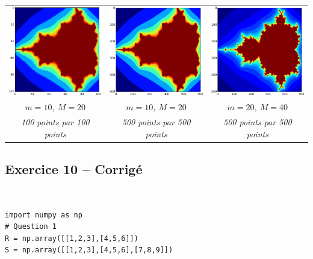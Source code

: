 \documentclass[10pt,fleqn]{article} %
\begin{document}
\begin{center}
\begin{tabular}{ccc}
\includegraphics[width=.3\linewidth]{programmes/Exercice_09/10_20_100} &
\includegraphics[width=.3\linewidth]{programmes/Exercice_09/10_20_500} & 
\includegraphics[width=.3\linewidth]{programmes/Exercice_09/20_40_500} \\
\textit{$m=10$, $M=20$} &
\textit{$m=10$, $M=20$} &
\textit{$m=20$, $M=40$} \\
\textit{100 points par 100 points} & 
\textit{500 points par 500 points} & 
\textit{500 points par 500 points} \\
\end{tabular}
\end{center}



\subsection*{Exercice 10 -- Corrigé}
\begin{corrige}
$\quad$
\begin{lstlisting}
import numpy as np
# Question 1
R = np.array([[1,2,3],[4,5,6]])
S = np.array([[1,2,3],[4,5,6],[7,8,9]])
\end{lstlisting}
\end{corrige}
\end{document}
